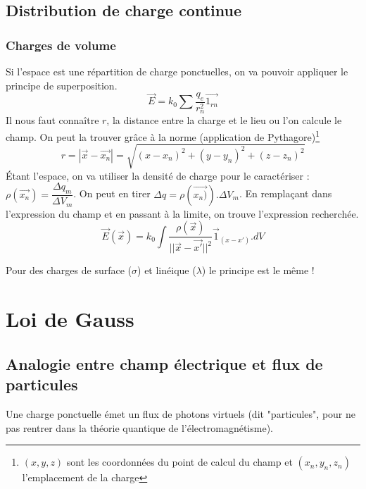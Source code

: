 \documentclass	[11pt, a4paper, openany]{book}
\begin{document}
\subsection{Distribution de charge continue}
\subsubsection{Charges de volume}
Si l'espace est une répartition de charge ponctuelles, on va pouvoir appliquer le principe de superposition.
\begin{equation}
	\vec E = k_0 \sum \frac{q_e}{r^2_n}\vec{1_{rn}}
\end{equation}
Il nous faut connaître $r$, la distance entre la charge et le lieu ou l'on calcule le champ. On peut la trouver grâce à la norme (application de Pythagore)\footnote{$(x,y,z)$ sont les coordonnées du point de calcul du champ et $(x_n, y_n, z_n)$ l'emplacement de la charge}
\begin{equation}
	r = |\vec{x} - \vec{x_n}| = \sqrt{(x-x_n)^2 + (y-y_n)^2 + (z-z_n)^2}
\end{equation}
Étant l'espace, on va utiliser la densité de charge pour le caractériser : $\rho(\vec{x_n}) = \dfrac{\Delta q_m}{\Delta V_m}$. On peut en tirer $\Delta q = \rho(\vec{x_n)}).\Delta V_m$. En remplaçant dans l'expression du champ et en passant à la limite, on trouve l'expression recherchée.
\begin{equation}
	\vec{E}(\vec x) = k_0 \int \frac{\rho(\vec x)}{||\vec{x} - \vec{x'}||^2}\vec{1}_{(x-x')}.dV
\end{equation}

Pour des charges de surface ($\sigma$) et linéique ($\lambda$) le principe est le même ! 


\section{Loi de Gauss}
\subsection{Analogie entre champ électrique et flux de particules}
Une charge ponctuelle émet un flux de photons virtuels (dit "particules", pour ne pas rentrer dans la théorie quantique de l'électromagnétisme).
\end{document}

